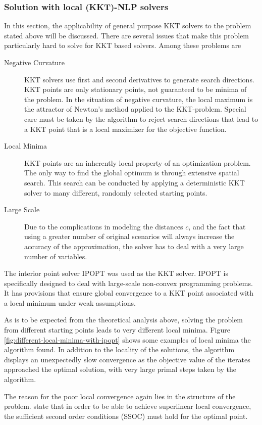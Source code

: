 \subsubsection{Solution with local (KKT)-NLP solvers}
In this section, the applicability of general purpose KKT solvers to the problem stated above will be discussed. There are several issues that make this problem particularly hard to solve for KKT based solvers. Among these problems are
\begin{description}
\item[Negative Curvature] KKT solvers use first and second derivatives to generate search directions. KKT points are only stationary points, not guaranteed to be minima of the problem. In the situation of negative curvature, the local maximum is the attractor of Newton's method applied to the KKT-problem. Special care must be taken by the algorithm to reject search directions that lead to a KKT point that is a local maximizer for the objective function.
\item[Local Minima] KKT points are an inherently local property of an optimization problem. The only way to find the global optimum is through extensive spatial search. This search can be conducted by applying a deterministic KKT solver to many different, randomly selected starting points.
\item[Large Scale] Due to the complications in modeling the distances $c$, and the fact that using a greater number of original scenarios will always increase the accuracy of the approximation, the solver has to deal with a very large number of variables.
\end{description}
The interior point solver IPOPT \cite{IpoptImplementation2006} was used as the KKT solver. IPOPT is specifically designed to deal with large-scale non-convex programming problems. It has provisions that ensure global convergence to a KKT point associated with a local minimum under weak assumptions.

As is to be expected from the theoretical analysis above, solving the problem from different starting points leads to very different local minima. Figure \ref{fig:different-local-minima-with-ipopt} shows some examples of local minima the algorithm found. In addition to the locality of the solutions, the algorithm displays an unexpectedly slow convergence as the objective value of the iterates approached the optimal solution, with very large primal steps taken by the algorithm.

The reason for the poor local convergence again lies in the structure of the problem.  state that in order to be able to achieve superlinear local convergence, the sufficient second order conditions (SSOC) must hold for the optimal point.

